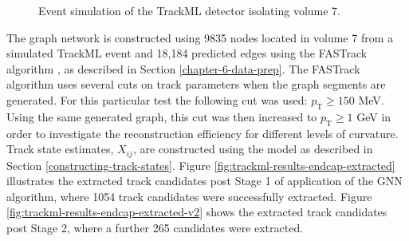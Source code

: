 \begin{figure}[htbp!] 
    \centering
    \hfill%
    \caption{Event simulation of the TrackML detector isolating volume 7.}
    \label{fig:trackml-results-endcap-nodes-sim}
\end{figure}


The graph network is constructed using 9835 nodes located in volume 7 from a simulated TrackML event and 18,184 predicted edges using the FASTrack algorithm \cite{Dmitry-fasttrack-addtest}, as described in Section \ref{chapter-6-data-prep}. The FASTrack algorithm uses several cuts on track parameters when the graph segments are generated. For this particular test the following cut was used: $p_{\text{T}} \ge 150$ MeV. Using the same generated graph, this cut was then increased to $p_{\text{T}} \ge 1$ GeV in order to investigate the reconstruction efficiency for different levels of curvature. Track state estimates, $X_{ij}$, are constructed using the model as described in Section \ref{constructing-track-states}. Figure \ref{fig:trackml-results-endcap-extracted} illustrates the extracted track candidates post Stage 1 of application of the GNN algorithm, where 1054 track candidates were successfully extracted. Figure \ref{fig:trackml-results-endcap-extracted-v2} shows the extracted track candidates post Stage 2, where a further 265 candidates were extracted.

